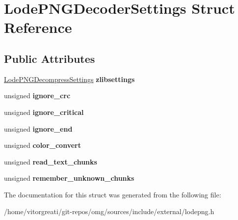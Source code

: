 \hypertarget{struct_lode_p_n_g_decoder_settings}{}\section{Lode\+P\+N\+G\+Decoder\+Settings Struct Reference}
\label{struct_lode_p_n_g_decoder_settings}
\subsection*{Public Attributes}
\begin{DoxyCompactItemize}
\item 
\mbox{\label{struct_lode_p_n_g_decoder_settings_a9ae8fef9880bef97a3e932f8ea942ed8}} 
\mbox{\hyperlink{struct_lode_p_n_g_decompress_settings}{Lode\+P\+N\+G\+Decompress\+Settings}} {\bfseries zlibsettings}
\item 
\mbox{\label{struct_lode_p_n_g_decoder_settings_a6390c403d2a5718242337bbbaf15131d}} 
unsigned {\bfseries ignore\+\_\+crc}
\item 
\mbox{\label{struct_lode_p_n_g_decoder_settings_a51c3ce791f1b1d325d5e1f7e18caeeea}} 
unsigned {\bfseries ignore\+\_\+critical}
\item 
\mbox{\label{struct_lode_p_n_g_decoder_settings_aa8f3907b3dcaf09892a752806be2fc59}} 
unsigned {\bfseries ignore\+\_\+end}
\item 
\mbox{\label{struct_lode_p_n_g_decoder_settings_af26f2b29cd338ce4476bee9571a0818a}} 
unsigned {\bfseries color\+\_\+convert}
\item 
\mbox{\label{struct_lode_p_n_g_decoder_settings_aa1212905c3f73d9fffef2c04a220d951}} 
unsigned {\bfseries read\+\_\+text\+\_\+chunks}
\item 
\mbox{\label{struct_lode_p_n_g_decoder_settings_a8775e4fc539dc457916720f52b442f27}} 
unsigned {\bfseries remember\+\_\+unknown\+\_\+chunks}
\end{DoxyCompactItemize}


The documentation for this struct was generated from the following file\+:\begin{DoxyCompactItemize}
\item 
/home/vitorgreati/git-\/repos/omg/sources/include/external/lodepng.\+h\end{DoxyCompactItemize}

